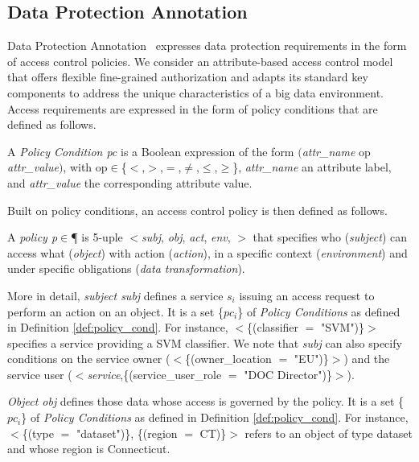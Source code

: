       \subsection{Data Protection Annotation}\label{sec:nonfuncannotation}
      Data Protection Annotation \myLambda\ expresses data protection requirements in the form of access control policies. We consider an attribute-based access control model that offers flexible fine-grained authorization and adapts its standard key components to address the unique characteristics of a big data environment. Access requirements are expressed in the form of policy conditions that are defined as follows.

      \begin{definition}\label{def:policy_cond}
        A \emph{Policy Condition pc} is a Boolean expression of the form $($\emph{attr\_name} op \emph{attr\_value}$)$, with op$\in$\{$<$,$>$,$=$,$\neq$,$\leq$,$\geq$\}, \emph{attr\_name} an attribute label, and \emph{attr\_value} the corresponding attribute value.
      \end{definition}

      Built on policy conditions, an access control policy is then defined as follows.

      \begin{definition}[Policy]\label{def:policy_rule}
        A {\it policy p}$\in$\P{} is 5-uple $<$\textit{subj}, \textit{obj}, \textit{act}, \textit{env}, \textit{\TP}$>$ that specifies who (\emph{subject}) can access what (\emph{object}) with action (\emph{action}), in a specific context (\emph{environment}) and under specific obligations (\emph{data transformation}).
      \end{definition}

      More in detail, \textit{subject subj} defines a service $s_i$ issuing an access request to perform an action on an object. It is a set \{$pc_i$\} of \emph{Policy Conditions} as defined in Definition \ref{def:policy_cond}. For instance, $<$\{(classifier $=$ "SVM")\}$>$ specifies a service providing a SVM classifier. We note that \textit{subj} can also specify conditions on the service owner ($<$\{(owner\_location $=$ "EU")\}$>$) and the service user ($<$\emph{service},\{(service\_user\_role $=$ "DOC Director")\}$>$).

      \textit{Object obj} defines those data whose access is governed by the policy. It is a set \{$pc_i$\} of \emph{Policy Conditions} as defined in Definition \ref{def:policy_cond}.
      For instance, $<$\{(type $=$ "dataset")\}, \{(region $=$ CT)\}$>$ refers to an object of type dataset and whose region is Connecticut.

